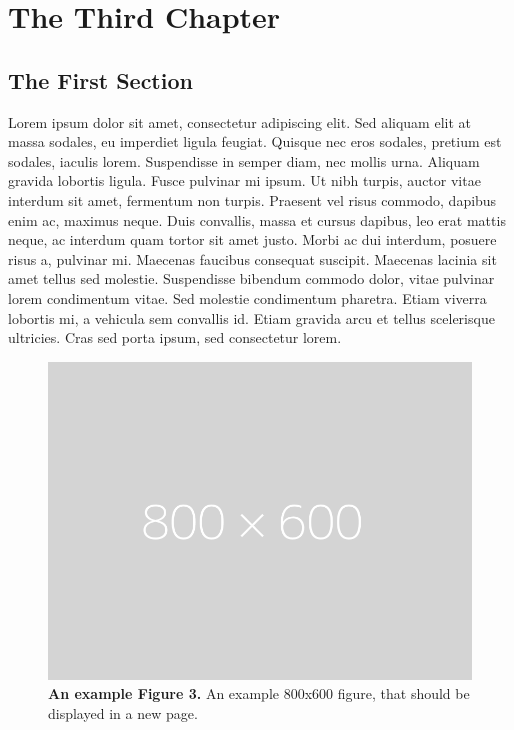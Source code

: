\chapter{The Third Chapter}
\section{The First Section}
Lorem ipsum dolor sit amet, consectetur adipiscing elit. Sed aliquam elit at massa sodales, eu imperdiet ligula feugiat. Quisque nec eros sodales, pretium est sodales, iaculis lorem. Suspendisse in semper diam, nec mollis urna. Aliquam gravida lobortis ligula. Fusce pulvinar mi ipsum. Ut nibh turpis, auctor vitae interdum sit amet, fermentum non turpis. Praesent vel risus commodo, dapibus enim ac, maximus neque. Duis convallis, massa et cursus dapibus, leo erat mattis neque, ac interdum quam tortor sit amet justo. Morbi ac dui interdum, posuere risus a, pulvinar mi. Maecenas faucibus consequat suscipit. Maecenas lacinia sit amet tellus sed molestie. Suspendisse bibendum commodo dolor, vitae pulvinar lorem condimentum vitae. Sed molestie condimentum pharetra. Etiam viverra lobortis mi, a vehicula sem convallis id. Etiam gravida arcu et tellus scelerisque ultricies. Cras sed porta ipsum, sed consectetur lorem.

\begin{figure}[p]
    \centering
    \includegraphics[width=\textwidth]{figures/placeholder.png}
    \caption[An example Figure 3.]{\textbf{An example Figure 3.} An example 800x600 figure, that should be displayed in a new page.}
    \label{figlabel3}
\end{figure}

